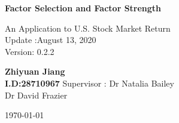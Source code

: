 \begin{titlepage}
\begin{center}
\vspace*{1cm}
\Huge
\textbf{Factor Selection and Factor Strength}

\vspace{0.5cm}
\LARGE
An Application to U.S. Stock Market Return\\
\Large
Update :August 13, 2020 \\
Version: 0.2.2

\vspace{1.5 cm}
\textbf{Zhiyuan Jiang\\I.D:28710967}
\vfill
 Supervisor : Dr Natalia Bailey\\\hspace{30mm} Dr David Frazier
 \vspace{0.8cm}
 
\Large
\today
\end{center}
\end{titlepage}